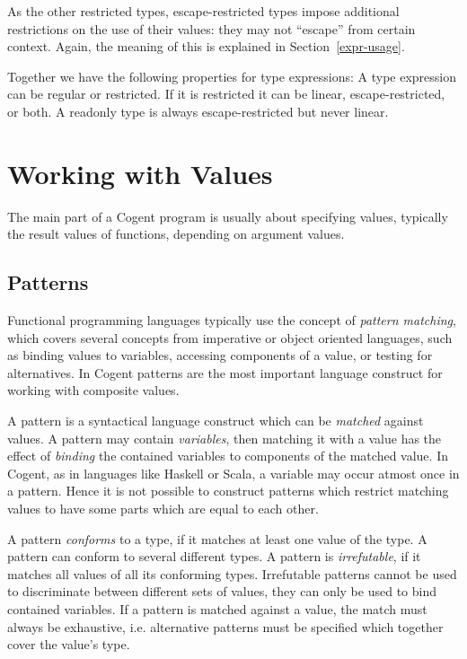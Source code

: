 \documentclass[a4paper]{report}
\newcommand{\cogent}{Cogent\xspace}
\begin{document}
As the other restricted types, escape-restricted types impose additional restrictions on the use of their values: they 
may not ``escape'' from certain context. Again, the meaning of this is explained in Section~\ref{expr-usage}.

Together we have the following properties for type expressions: A type expression can be regular or restricted. If it is restricted 
it can be linear, escape-restricted, or both. A readonly type is always escape-restricted but never linear.

\chapter{Working with Values}

The main part of a \cogent program is usually about specifying values, typically the result values of functions, depending on argument values. 

\section{Patterns}

Functional programming languages typically use the concept of \textit{pattern matching}, which covers several concepts from imperative or 
object oriented languages, such as binding values to variables, accessing components of a value, or testing for alternatives. In \cogent 
patterns are the most important language construct for working with composite values.

A pattern is a syntactical language construct which can be \textit{matched} against values. A pattern may contain \textit{variables}, 
then matching it with a value has the effect of \textit{binding} the contained variables to components of the matched value. In \cogent, 
 as  in languages like Haskell or Scala, a variable may occur atmost once in a pattern. Hence it is not possible to construct patterns 
which restrict matching values to have some parts which are equal to each other.

A pattern \textit{conforms} to a type, if it matches at least one value of the type. A pattern can conform to several different types. 
A pattern is \textit{irrefutable}, if it matches all values of all its conforming types. Irrefutable patterns cannot be used to discriminate 
between different sets of values, they can only be used to bind contained variables.  If a pattern is matched
against a value, the match must always be exhaustive, i.e. alternative patterns must be specified which together cover
the value's type. 
\end{document}
